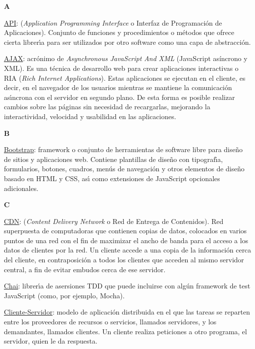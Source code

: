 {\bfseries {\Huge A}}\label{Apendice1:A}
\bigskip
\bigskip

\underline{API}: (\textit{Application Programming Interface} o Interfaz de Programaci\'on de Aplicaciones). Conjunto de funciones y procedimientos o m\'etodos que ofrece cierta librer\'{\i}a 
para ser utilizados por otro software como una capa de abstracci\'on. 
\bigskip

\underline{AJAX}: acr\'onimo de \textit{Asynchronous JavaScript And XML} (JavaScript asíncrono y XML). Es una t\'ecnica de desarrollo web para crear aplicaciones 
interactivas o RIA (\textit{Rich Internet Applications}). Estas aplicaciones se ejecutan en el cliente, es decir, en el navegador de los usuarios mientras se 
mantiene la comunicaci\'on as\'{\i}ncrona con el servidor en segundo plano. De esta forma es posible realizar cambios sobre las p\'aginas sin necesidad de 
recargarlas, mejorando la interactividad, velocidad y usabilidad en las aplicaciones.
\bigskip

\bigskip
{\bfseries {\Huge B}}\label{Apendice1:B}
\bigskip
\bigskip

\href{http://getbootstrap.com/}{\underline{Bootstrap}}: framework o conjunto de herramientas de software libre para dise\~{n}o de sitios y aplicaciones web. 
Contiene plantillas de dise\~{n}o con tipograf\'{\i}a, formularios, botones, cuadros, men\'us de navegaci\'on y otros elementos de dise\~{n}o basado en HTML 
y CSS, as\'{\i} como extensiones de JavaScript opcionales adicionales.
\bigskip

\bigskip
{\bfseries {\Huge C}}\label{Apendice1:C}
\bigskip
\bigskip

\underline{CDN}: (\textit{Content Delivery Network} o Red de Entrega de Contenidos). Red superpuesta de computadoras que contienen copias de datos, colocados en varios 
puntos de una red con el fin de maximizar el ancho de banda para el acceso a los datos de clientes por la red. Un cliente accede a una copia de la informaci\'on cerca 
del cliente, en contraposici\'on a todos los clientes que acceden al mismo servidor central, a fin de evitar embudos cerca de ese servidor.
\bigskip

\href{http://chaijs.com/}{\underline{Chai}}: librer\'{\i}a de asersiones TDD que puede incluirse con alg\'un framework de test JavaScript (como, por ejemplo, Mocha).
\bigskip

\underline{Cliente-Servidor}: modelo de aplicaci\'on distribuida en el que las tareas se reparten entre los proveedores de recursos o servicios, llamados servidores, y 
los demandantes, llamados clientes. Un cliente realiza peticiones a otro programa, el servidor, quien le da respuesta.
\bigskip


